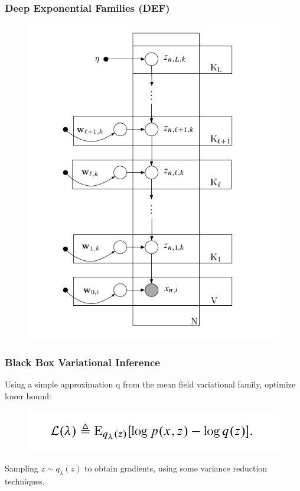 \documentclass{beamer}
\begin{document}
\begin{frame}
\frametitle{Deep Exponential Families (DEF)}
\begin{figure}
\includegraphics[scale=0.3]{DEF_structure.png}
\end{figure}
\end{frame}

\begin{frame}
\frametitle{Black Box Variational Inference}
Using a simple approximation q from the mean field variational family, optimize lower bound: 
\begin{figure}
\includegraphics[scale=0.3]{ELBO.png}
\end{figure}
Sampling $z \sim q_\lambda (z)$ to obtain gradients, using some variance reduction techniques.
\end{frame}
\end{document}
